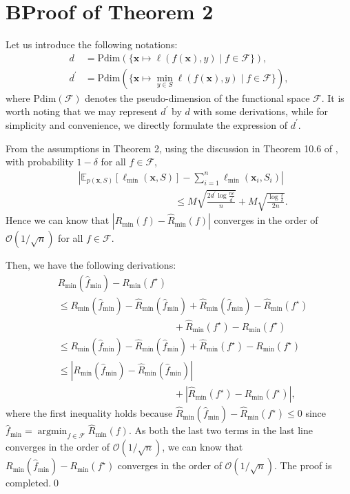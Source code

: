 \documentclass[letterpaper]{article} %
\newcommand{\argmin}{\mathop{\arg\min}}
\begin{document}
\section{B\quad Proof of Theorem 2}
Let us introduce the following notations: 
\begin{align}
\nonumber
d &=\mathrm{Pdim}(\{\bm{x}\mapsto \ell(f(\bm{x}),y)\mid f\in\mathcal{F}\}),\\
\nonumber
d^\prime &= \mathrm{Pdim}(\{\bm{x}\mapsto \min_{y\in S}\ell(f(\bm{x}),y)\mid f\in\mathcal{F}\}),
\end{align}
where $\mathrm{Pdim}(\mathcal{F})$ denotes the pseudo-dimension of the functional space $\mathcal{F}$. It is worth noting that we may represent $d^\prime$ by $d$ with some derivations, while for simplicity and convenience, we directly formulate the expression of $d^\prime$.

From the assumptions in Theorem 2, using the discussion in Theorem 10.6 of \citet{mohri2012foundations}, with probability $1-\delta$ for all $f\in\mathcal{F}$,
\begin{align}
\nonumber
&\left|\mathbb{E}_{p(\bm{x},S)}[\ell_{\mathrm{min}}(\bm{x},S)] - \sum_{i=1}^n\ell_{\mathrm{min}}(\bm{x}_i,S_i)\right| \\
\nonumber
&\qquad\qquad\qquad\qquad\qquad\leq M\sqrt{\frac{2d^\prime\log\frac{ne}{d^\prime}}{n}}+M\sqrt{\frac{\log\frac{2}{\delta}}{2n}}.
\end{align}
Hence we can know that $\left|R_{\mathrm{min}}(f)-\widehat{R}_{\mathrm{min}}(f)\right|$ converges in the order of $\mathcal{O}(1/\sqrt{n})$ for all $f\in\mathcal{F}$.

Then, we have the following derivations:
\begin{align}
\nonumber
&R_{\mathrm{min}}(\widehat{f}_{\mathrm{min}})-R_{\mathrm{min}}(f^\star)\\
\nonumber
&\leq R_{\mathrm{min}}(\widehat{f}_{\mathrm{min}}) - \widehat{R}_{\mathrm{min}}(\widehat{f}_{\mathrm{min}}) + \widehat{R}_{\mathrm{min}}(\widehat{f}_{\mathrm{min}}) - \widehat{R}_{\mathrm{min}}(f^\star) \\
\nonumber
&\qquad\qquad\qquad\qquad\qquad\qquad
+ \widehat{R}_{\mathrm{min}}(f^\star) - R_{\mathrm{min}}(f^\star)\\
\nonumber
&\leq R_{\mathrm{min}}(\widehat{f}_{\mathrm{min}}) - \widehat{R}_{\mathrm{min}}(\widehat{f}_{\mathrm{min}}) + \widehat{R}_{\mathrm{min}}(f^\star) - R_{\mathrm{min}}(f^\star)\\
\nonumber
&\leq \left|R_{\mathrm{min}}(\widehat{f}_{\mathrm{min}}) - \widehat{R}_{\mathrm{min}}(\widehat{f}_{\mathrm{min}})\right|\\
\nonumber
&\qquad\qquad\qquad\qquad\qquad\qquad+ \left|\widehat{R}_{\mathrm{min}}(f^\star) - R_{\mathrm{min}}(f^\star)\right|,
\end{align}
where the first inequality holds because $\widehat{R}_{\mathrm{min}}(\widehat{f}_{\mathrm{min}}) - \widehat{R}_{\mathrm{min}}(f^\star)\leq 0$ since $\widehat{f}_{\mathrm{min}}=\argmin_{f\in\mathcal{F}}\widehat{R}_{\mathrm{min}}(f)$. As both the last two terms in the last line converges in the order of $\mathcal{O}(1/\sqrt{n})$, we can know that $R_{\mathrm{min}}(\widehat{f}_{\mathrm{min}})-R_{\mathrm{min}}(f^\star)$ converges in the order of $\mathcal{O}(1/\sqrt{n})$.
The proof is completed.\qed
\end{document}
